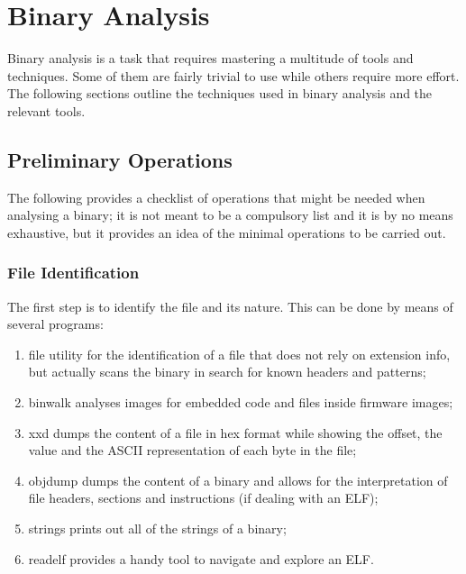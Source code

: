 \chapter{Binary Analysis}
Binary analysis is a task that requires mastering a multitude of tools and techniques. Some of them are fairly trivial
to use while others require more effort. The following sections outline the techniques used in binary analysis and the
relevant tools.



\section{Preliminary Operations}
The following provides a checklist of operations that might be needed when analysing a binary; it is not meant to be a
compulsory list and it is by no means exhaustive, but it provides an idea of the minimal operations to be carried out.


\subsection{File Identification}
The first step is to identify the file and its nature. This can be done by means of several programs:
\begin{enumerate}
    \item {\ttfamily file} utility for the identification of a file that does not rely on extension info, but actually
        scans the binary in search for known headers and patterns;
    \item {\ttfamily binwalk} analyses images for embedded code and files inside firmware images;
    \item {\ttfamily xxd} dumps the content of a file in hex format while showing the offset, the value and the ASCII
        representation of each byte in the file;
    \item {\ttfamily objdump} dumps the content of a binary and allows for the interpretation of file headers, sections
        and instructions (if dealing with an ELF);
    \item {\ttfamily strings} prints out all of the strings of a binary;
    \item {\ttfamily readelf} provides a handy tool to navigate and explore an ELF.
\end{enumerate}


